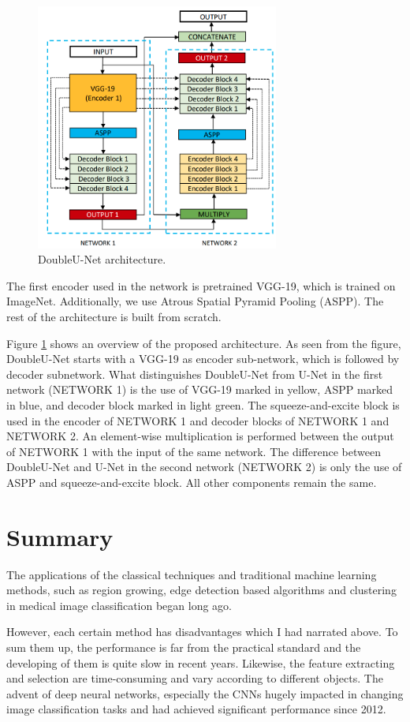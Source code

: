 \begin{figure}[h]
    \centering \includegraphics[width=8cm]{images/DoubleU-Net.png}
    \caption {DoubleU-Net architecture.}
    \label{fig:double_unet}
\end{figure}

The first encoder used in the network is pretrained VGG-19, which is trained on ImageNet. Additionally, we use Atrous Spatial Pyramid Pooling (ASPP). The rest of the architecture is built from scratch. 

Figure \ref{fig:double_unet} shows an overview of the proposed architecture. As seen from the figure, DoubleU-Net starts with a VGG-19 as encoder sub-network, which is followed by decoder subnetwork. What distinguishes DoubleU-Net from U-Net in the
first network (NETWORK 1) is the use of VGG-19 marked in yellow, ASPP marked in blue, and decoder block marked in light green. The squeeze-and-excite block is used in the encoder of NETWORK 1 and decoder blocks of NETWORK 1 and NETWORK 2. An element-wise multiplication is performed between the output of NETWORK 1 with the input of the same network. The difference between DoubleU-Net and U-Net in the second network (NETWORK 2) is only the use of ASPP and squeeze-and-excite block. All other components remain the same.


\section{Summary}
The applications of the classical techniques and traditional machine learning methods, such as region growing, edge detection based algorithms and clustering in medical image classification began long ago. 

However, each certain method has disadvantages which I had narrated above. To sum them up, the performance is far from the practical standard and the developing of them is quite slow in recent years. Likewise, the feature extracting and selection are time-consuming and vary according to different objects. The advent of deep neural networks, especially the CNNs hugely impacted in changing image classification tasks and had achieved significant performance since 2012.

